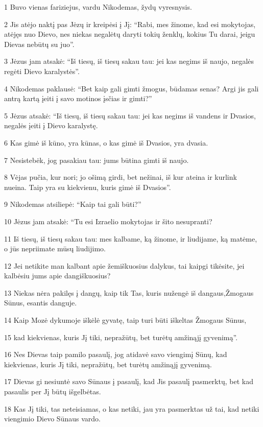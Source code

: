 \par 1 Buvo vienas fariziejus, vardu Nikodemas, žydų vyresnysis. 
\par 2 Jis atėjo naktį pas Jėzų ir kreipėsi į Jį: “Rabi, mes žinome, kad esi mokytojas, atėjęs nuo Dievo, nes niekas negalėtų daryti tokių ženklų, kokius Tu darai, jeigu Dievas nebūtų su juo”. 
\par 3 Jėzus jam atsakė: “Iš tiesų, iš tiesų sakau tau: jei kas negims iš naujo, negalės regėti Dievo karalystės”. 
\par 4 Nikodemas paklausė: “Bet kaip gali gimti žmogus, būdamas senas? Argi jis gali antrą kartą įeiti į savo motinos įsčias ir gimti?” 
\par 5 Jėzus atsakė: “Iš tiesų, iš tiesų sakau tau: jei kas negims iš vandens ir Dvasios, negalės įeiti į Dievo karalystę. 
\par 6 Kas gimė iš kūno, yra kūnas, o kas gimė iš Dvasios, yra dvasia. 
\par 7 Nesistebėk, jog pasakiau tau: jums būtina gimti iš naujo. 
\par 8 Vėjas pučia, kur nori; jo ošimą girdi, bet nežinai, iš kur ateina ir kurlink nueina. Taip yra su kiekvienu, kuris gimė iš Dvasios”. 
\par 9 Nikodemas atsiliepė: “Kaip tai gali būti?” 
\par 10 Jėzus jam atsakė: “Tu esi Izraelio mokytojas ir šito nesupranti? 
\par 11 Iš tiesų, iš tiesų sakau tau: mes kalbame, ką žinome, ir liudijame, ką matėme, o jūs nepriimate mūsų liudijimo. 
\par 12 Jei netikite man kalbant apie žemiškuosius dalykus, tai kaipgi tikėsite, jei kalbėsiu jums apie dangiškuosius? 
\par 13 Niekas nėra pakilęs į dangų, kaip tik Tas, kuris nužengė iš dangaus,­Žmogaus Sūnus, esantis danguje. 
\par 14 Kaip Mozė dykumoje iškėlė gyvatę, taip turi būti iškeltas Žmogaus Sūnus, 
\par 15 kad kiekvienas, kuris Jį tiki, nepražūtų, bet turėtų amžinąjį gyvenimą”. 
\par 16 Nes Dievas taip pamilo pasaulį, jog atidavė savo viengimį Sūnų, kad kiekvienas, kuris Jį tiki, nepražūtų, bet turėtų amžinąjį gyvenimą. 
\par 17 Dievas gi nesiuntė savo Sūnaus į pasaulį, kad Jis pasaulį pasmerktų, bet kad pasaulis per Jį būtų išgelbėtas. 
\par 18 Kas Jį tiki, tas neteisiamas, o kas netiki, jau yra pasmerktas už tai, kad netiki viengimio Dievo Sūnaus vardo. 

